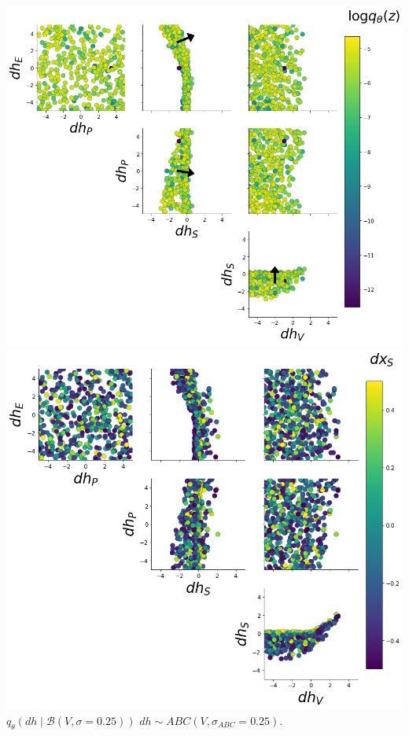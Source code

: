 \documentclass[11pt]{article}
\begin{document}
\begin{center}
\includegraphics[scale=0.25]{figs/V1_drdh_EPI_S.png} 
\includegraphics[scale=0.25]{figs/V1_drdh_ABC_S.png} \\
$q_\theta(dh \mid \mathcal{B}(V,\sigma=0.25))$ \hspace{1.2in} $dh \sim ABC(V,\sigma_{ABC}=0.25)$. \\

\end{center}
\end{document}

